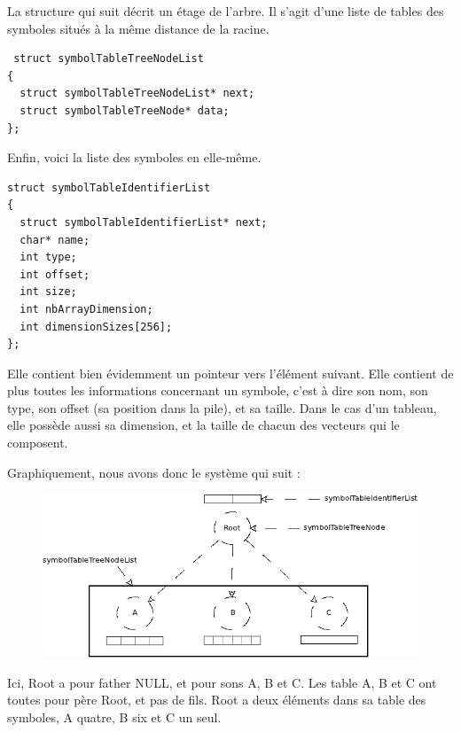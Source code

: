 La structure qui suit décrit un étage de l'arbre. Il s'agit d'une liste de tables des symboles situés à la même distance de la racine.

\begin{verbatim} 
 struct symbolTableTreeNodeList
{
  struct symbolTableTreeNodeList* next;
  struct symbolTableTreeNode* data;
};
\end{verbatim} 

Enfin, voici la liste des symboles en elle-même.

\begin{verbatim}
struct symbolTableIdentifierList
{
  struct symbolTableIdentifierList* next;
  char* name;
  int type;
  int offset;
  int size;
  int nbArrayDimension;
  int dimensionSizes[256];
};
\end{verbatim} 
 
Elle contient bien évidemment un pointeur vers l'élément suivant.
Elle contient de plus toutes les informations concernant un symbole, c'est à dire son nom, son type, son offset (sa position dans la pile), et sa taille.
Dans le cas d'un tableau, elle possède aussi sa dimension, et la taille de chacun des vecteurs qui le composent.

Graphiquement, nous avons donc le système qui suit : 

\begin{figure}[h!]
\includegraphics[scale=0.5]{arbresym}
\end{figure}

Ici, Root a pour father NULL, et pour sons A, B et C.
Les table A, B et C ont toutes pour père Root, et pas de fils.
Root a deux éléments dans sa table des symboles, A quatre, B six et C un seul.